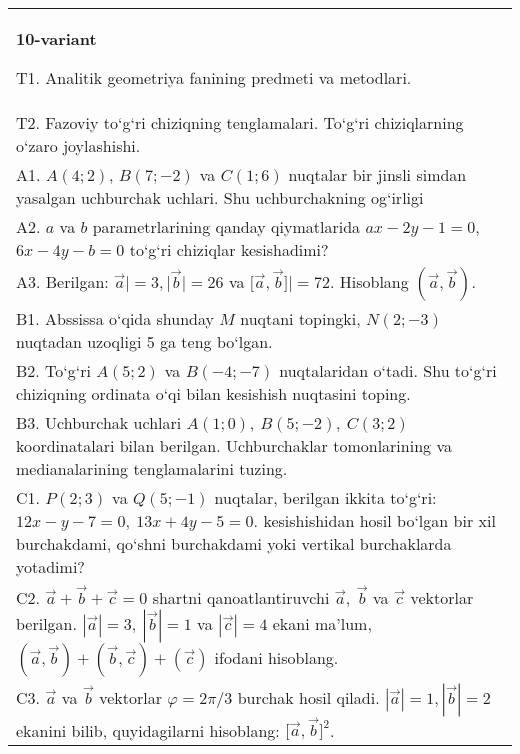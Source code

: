 \documentclass{article}
\begin{document}
\begin{tabular}{m{17cm}}
\textbf{10-variant}

T1. Analitik geometriya fanining predmeti va metodlari.
 \\
T2. 
Fazoviy to‘g‘ri chiziqning tenglamalari. To‘g‘ri chiziqlarning o‘zaro joylashishi.
 \\
A1. 
$A (4;2) $, $B (7;-2) $ va $C (1;6) $ nuqtalar bir jinsli
simdan yasalgan uchburchak uchlari. Shu uchburchakning og‘irligi
 \\
A2. 
$a$ va $b$ parametrlarining qanday qiymatlarida
$ax-2y-1=0$, $6x-4y-b=0$ to‘g‘ri chiziqlar kesishadimi?
 \\
A3. 
Berilgan: $\overrightarrow{a}| = 3,|\overrightarrow{b}| = 26$ va
$\lbrack\overrightarrow{a},\overrightarrow{b}\rbrack| = 72$. Hisoblang
$\left(\overrightarrow{a},\overrightarrow{b} \right) $.
 \\
B1. 
Abssissa o‘qida shunday $M$ nuqtani topingki,
\(N (2;-3) \) nuqtadan uzoqligi 5 ga teng bo‘lgan.
 \\
B2. 
To‘g‘ri \(A (5;2) \) va \(B (-4; -7) \) nuqtalaridan o‘tadi.
Shu to‘g‘ri chiziqning ordinata o‘qi bilan kesishish nuqtasini toping.
 \\
B3. 
Uchburchak uchlari \(A (1;0),\ B (5;-2),\ C (3;2) \)
koordinatalari bilan berilgan. Uchburchaklar tomonlarining va
medianalarining tenglamalarini tuzing.
 \\
C1. 
\(P (2;3) \) va \(Q (5;-1) \) nuqtalar, berilgan ikkita
to‘g‘ri: $12x-y-7=0,\ 13x+4y-5=0$.
kesishishidan hosil bo‘lgan bir xil burchakdami, qo‘shni burchakdami yoki vertikal
burchaklarda yotadimi?
 \\
C2. 
$\vec{a} + \vec{b} + \vec{c} = 0$ shartni qanoatlantiruvchi $\vec{a},\ \vec{b}$ va $\vec{c}$ vektorlar berilgan. $|\vec{a}| = 3,\ |\vec{b}| = 1$ va $|\vec{c}| = 4$ ekani ma’lum, $\left(\vec{a},\vec{b} \right) + \left(\vec{b},\vec{c} \right) + (\vec{c}) $ ifodani hisoblang.
 \\
C3. 
$\vec{a}$ va $\vec{b}$ vektorlar $\varphi = 2\pi/3$ burchak hosil qiladi. $|\vec{a}| = 1,|\vec{b}| = 2$ ekanini bilib, quyidagilarni hisoblang:
$\lbrack\vec{a},\vec{b}\rbrack^{2}$.
 \\

\end{tabular}
\vspace{1cm}
\end{document}
